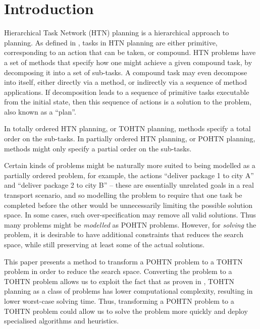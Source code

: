 \chapter{Introduction}

Hierarchical Task Network (HTN) planning is a hierarchical approach to planning. As defined in \cite{HTNSurvey},  %
tasks in HTN planning are either primitive, corresponding to an action that can be taken, or compound. HTN problems have a set of methods that specify how one might achieve a given compound task, by decomposing it into a set of sub-tasks. A compound task may even decompose into itself, either directly via a method, or indirectly via a sequence of method applications. If decomposition leads to a sequence of primitive tasks executable from the initial state, then this sequence of actions is a solution to the problem, also known as a \enquote{plan}. 

In totally ordered HTN planning, or TOHTN planning, methods specify a total order on the sub-tasks. In partially ordered HTN planning, or POHTN planning, methods might only specify a partial order on the sub-tasks. 


Certain kinds of problems might be naturally more suited to being modelled as a partially ordered problem, for example, the actions \enquote{deliver package 1 to city A} and \enquote{deliver package 2 to city B} -- these are essentially unrelated goals in a real transport scenario, and so modelling the problem to require that one task be completed before the other would be unnecessarily limiting the possible solution space. In some cases, such over-specification may remove all valid solutions. Thus many problems might be \emph{modelled} as POHTN problems. However, for \emph{solving} the problem, it is desirable to have additional constraints that reduces the search space, while still preserving at least some of the actual solutions.

This paper presents a method to transform a POHTN problem to a TOHTN problem in order to reduce the search space. Converting the problem to a TOHTN problem allows us to exploit the fact that as proven in \cite{ErolHTNExpressivity},  TOHTN planning as a class of problems has lower computational complexity, resulting in lower worst-case solving time. 
Thus, transforming a POHTN problem to a TOHTN problem could allow us to solve the problem more quickly and deploy specialised algorithms and heuristics.

